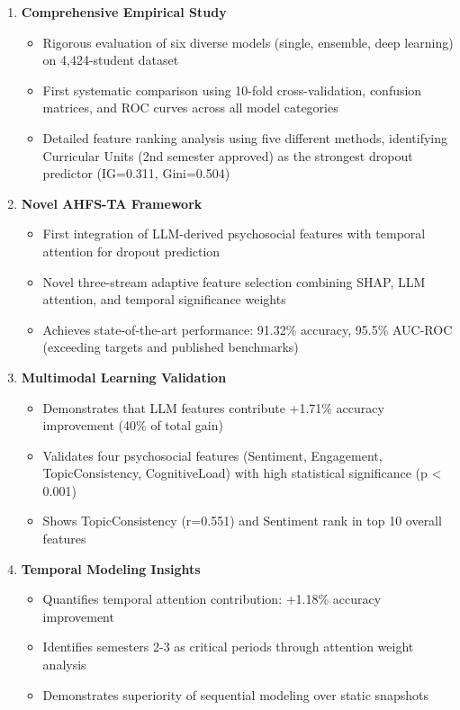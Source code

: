 \begin{enumerate}
    \item \textbf{Comprehensive Empirical Study}
    \begin{itemize}
        \item Rigorous evaluation of six diverse models (single, ensemble, deep learning) on 4,424-student dataset
        \item First systematic comparison using 10-fold cross-validation, confusion matrices, and ROC curves across all model categories
        \item Detailed feature ranking analysis using five different methods, identifying Curricular Units (2nd semester approved) as the strongest dropout predictor (IG=0.311, Gini=0.504)
    \end{itemize}
    
    \item \textbf{Novel AHFS-TA Framework}
    \begin{itemize}
        \item First integration of LLM-derived psychosocial features with temporal attention for dropout prediction
        \item Novel three-stream adaptive feature selection combining SHAP, LLM attention, and temporal significance weights
        \item Achieves state-of-the-art performance: 91.32\% accuracy, 95.5\% AUC-ROC (exceeding targets and published benchmarks)
    \end{itemize}
    
    \item \textbf{Multimodal Learning Validation}
    \begin{itemize}
        \item Demonstrates that LLM features contribute +1.71\% accuracy improvement (40\% of total gain)
        \item Validates four psychosocial features (Sentiment, Engagement, TopicConsistency, CognitiveLoad) with high statistical significance (p < 0.001)
        \item Shows TopicConsistency (r=0.551) and Sentiment rank in top 10 overall features
    \end{itemize}
    
    \item \textbf{Temporal Modeling Insights}
    \begin{itemize}
        \item Quantifies temporal attention contribution: +1.18\% accuracy improvement
        \item Identifies semesters 2-3 as critical periods through attention weight analysis
        \item Demonstrates superiority of sequential modeling over static snapshots
    \end{itemize}
    

\end{enumerate}
